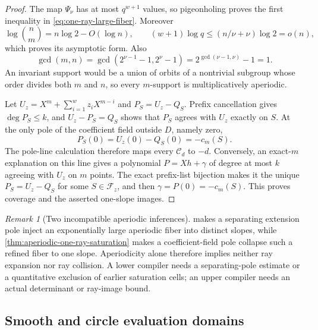 \documentclass[11pt,a4paper]{amsart}
\numberwithin{equation}{section}
\theoremstyle{remark}
\newtheorem{remark}[remark]{Remark}
\newcommand{\Ccal}{\mathcal C}
\newcommand{\Fcal}{\mathcal F}
\begin{document}
\begin{proof}
The map \(\Psi_\nu\) has at most \(q^{w+1}\) values, so pigeonholing
proves the first inequality in \eqref{eq:one-ray-large-fiber}.  Moreover
\[
 \log\binom nm=n\log2-O(\log n),\qquad
 (w+1)\log q\le(n/\nu+\nu)\log2=o(n),
\]
which proves its asymptotic form.  Also
\[
 \gcd(m,n)=\gcd(2^{\nu-1}-1,2^\nu-1)
           =2^{\gcd(\nu-1,\nu)}-1=1.
\]
An invariant support would be a union of orbits of a nontrivial subgroup
whose order divides both \(m\) and \(n\), so every \(m\)-support is
multiplicatively aperiodic.

Let \(U_z=X^m+\sum_{i=1}^wz_iX^{m-i}\) and
\(P_S=U_z-Q_S\).  Prefix cancellation gives \(\deg P_S\le k\), and
\(U_z-P_S=Q_S\) shows that \(P_S\) agrees with \(U_z\) exactly on \(S\).
At the only pole of the coefficient field outside \(D\), namely zero,
\[
                     P_S(0)=U_z(0)-Q_S(0)=-c_m(S).
\]
The pole-line calculation therefore maps every \(\Ccal_d\) to \(-d\).
Conversely, an exact-\(m\) explanation on this line gives a polynomial
\(P=Xh+\gamma\) of degree at most \(k\) agreeing with \(U_z\) on
\(m\) points.  The exact prefix-list bijection makes it the unique
\(P_S=U_z-Q_S\) for some \(S\in\Fcal_z\), and then
\(\gamma=P(0)=-c_m(S)\).  This proves coverage and the asserted
one-slope images.
\end{proof}

\begin{remark}[Two incompatible aperiodic inferences]
\label{rem:two-aperiodic-ray-extremes}
 makes a separating extension pole
inject an exponentially large aperiodic fiber into distinct slopes, while
\cref{thm:aperiodic-one-ray-saturation} makes a coefficient-field pole collapse
such a refined fiber to one slope.  Aperiodicity alone therefore implies
neither ray expansion nor ray collision.  A lower compiler needs a
separating-pole estimate or a quantitative exclusion of earlier saturation
cells; an upper compiler needs an actual determinant or ray-image bound.
\end{remark}

\subsection{Smooth and circle evaluation domains}\label{sec:smooth-circle-domains}
\end{document}
